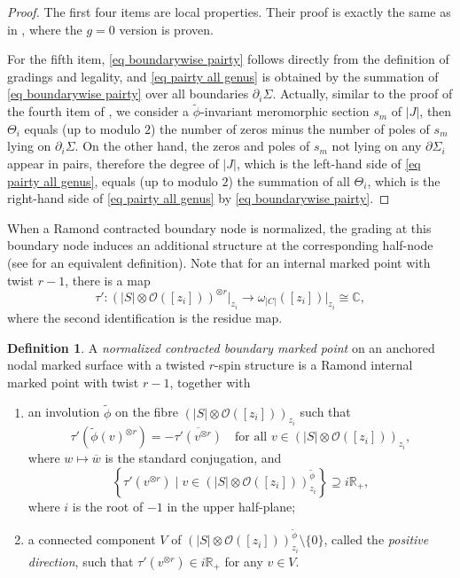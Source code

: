 \documentclass[11pt,a4paper]{article}
\theoremstyle{definition}
\newtheorem{definition}[dummy]{Definition}
\theoremstyle{remark}
\numberwithin{equation}{section}
\begin{document}
\begin{proof}
    The first four items are local properties. Their proof is exactly the same as in \cite[Proposition 2.5 and Observation 2.13]{BCT1}, where the $g=0$ version is proven. 

    For the fifth item, \eqref{eq boundarywise pairty} follows directly from the definition of gradings and legality, and \eqref{eq pairty all genus} is obtained by the summation of \eqref{eq boundarywise pairty} over all boundaries $\partial_i \Sigma$. Actually,  similar to the proof of the fourth item of \cite[Proposition 2.5]{BCT1},
    we consider a $\widetilde{\phi}$-invariant meromorphic section $s_m$ of $\lvert J \rvert$, then $\Theta_i$ equals (up to modulo $2$) the number of zeros minus the number of poles of $s_m$ lying on $\partial_i\Sigma$. On the other hand, the zeros and poles of $s_m$ not lying on any $\partial \Sigma_i$ appear in pairs, therefore the degree of $\lvert J\rvert$, which is the left-hand side of \eqref{eq pairty all genus}, equals (up to modulo $2$) the summation of all $\Theta_i$, which is the right-hand side of \eqref{eq pairty all genus} by \eqref{eq boundarywise pairty}.
\end{proof}


When a Ramond contracted boundary node is normalized, the grading at this boundary node induces an additional structure at the corresponding half-node (see \cite[Definition 2.8]{BCT1} for an equivalent definition). Note that for an internal marked point with twist $r-1$, there is a map
$$\tau': \left(|S|\otimes \mathcal O\left([z_i]\right)\right)^{\otimes r}\big|_{z_i}\to \omega_{|C|}([z_i])\big|_{z_i}\cong\mathbb C,$$
where the second identification is the residue map. 

\begin{definition}\label{def: normalized contracted boundary marking}
A \textit{normalized contracted boundary marked point} on an anchored nodal marked surface with a twisted $r$-spin structure is a Ramond internal marked point with twist $r-1$, together with
\begin{enumerate}
\item an involution $\widetilde{\phi}$ on the fibre $\left(|S|\otimes {\mathcal{O}}\left([z_i]\right)\right)_{z_i}$ such that
\[
\tau'(\widetilde{\phi}(v)^{\otimes r})=-\overline{\tau'(v^{\otimes r})}\quad \text{for all $v\in\left(|S|\otimes {\mathcal{O}}\left([z_i]\right)\right)_{z_i}$},
\]
where $w\mapsto\overline{w}$ is the standard conjugation, and
\[\left\{\tau'(v^{\otimes r})\; | \; v\in \left(|S|\otimes {\mathcal{O}}\left([z_i]\right)\right)^{\widetilde\phi}_{z_i}\right\}\supseteq i{\mathbb R}_+,\]where $i$ is the root of $-1$ in the upper half-plane;
\item a connected component $V$ of $\left(|S|\otimes {\mathcal{O}}\left([z_i]\right)\right)^{\widetilde\phi}_{z_i}\setminus\{0\}$, called the \textit{positive direction}, such that $\tau'(v^{\otimes r})\in i{\mathbb R}_+$ for any $v \in V$.
\end{enumerate}
\end{definition}
\end{document}

